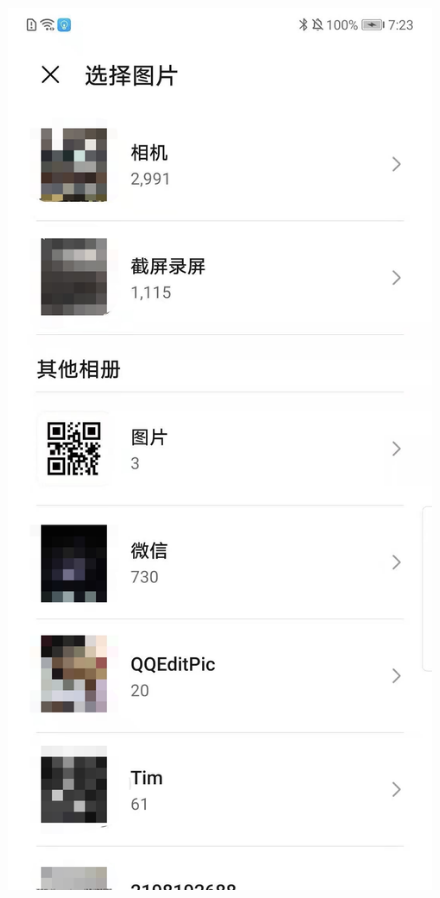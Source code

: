 \documentclass[12pt, a4paper]{article}
\theoremstyle{definition}
\begin{document}
\begin{figure}[htbp]
\begin{minipage}[t]{0.2\linewidth}
		\end{minipage}
		\begin{minipage}[t]{0.2\linewidth}
		\centering
		\includegraphics[width=\linewidth]{6-5.jpeg}

\end{minipage}
\end{figure}
\end{document}
